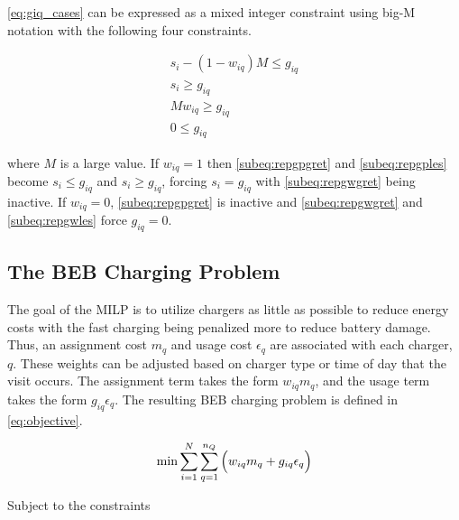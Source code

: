 \documentclass[utf8]{FrontiersinHarvard}
\begin{document}
\autoref{eq:giq_cases} can be expressed as a mixed integer constraint using big-M notation with the following four
constraints.

\begin{subequations}
    \label{eq:slack_gain}
\begin{align}
    s_i - (1 - w_{iq})M \leq g_{iq}  \label{subeq:repgpgret} \\
    s_i \geq g_{iq}                 \label{subeq:repgples} \\
    Mw_{iq} \geq g_{iq}              \label{subeq:repgwgret} \\
    0 \leq g_{iq}                   \label{subeq:repgwles}
\end{align}
\end{subequations}

\noindent
where \(M\) is a large value. If \(w_{iq} = 1\) then \autoref{subeq:repgpgret} and \autoref{subeq:repgples} become \(s_i \leq
g_{iq}\) and \(s_i \geq g_{iq}\), forcing \(s_i = g_{iq}\) with \autoref{subeq:repgwgret} being inactive. If \(w_{iq} = 0\),
\autoref{subeq:repgpgret} is inactive and \autoref{subeq:repgwgret} and \autoref{subeq:repgwles} force \(g_{iq} = 0\).

\subsection{The BEB Charging Problem}
\label{sec:BEB_MILP}
The goal of the MILP is to utilize chargers as little as possible to reduce energy costs with the fast charging being
penalized more to reduce battery damage. Thus, an assignment cost \(m_q\) and usage cost \(\epsilon_q\) are associated with each
charger, \(q\). These weights can be adjusted based on charger type or time of day that the visit occurs. The assignment
term takes the form \(w_{iq}m_q\), and the usage term takes the form \(g_{iq} \epsilon_q\). The resulting BEB charging problem is
defined in \autoref{eq:objective}.

\begin{equation}
\label{eq:objective}
	\min \sum_{i=1}^N \sum_{q=1}^{n_Q} \Big( w_{iq} m_q + g_{iq} \epsilon_q \Big) \\
\end{equation}

Subject to the constraints
\end{document}
